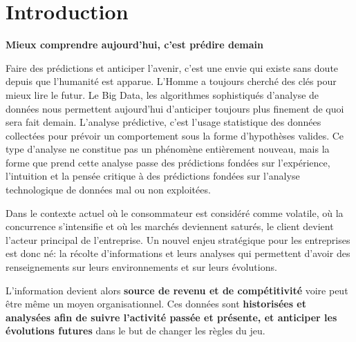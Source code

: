 \documentclass[12pt]{article}
\renewcommand{\listfigurename}{Liste des figues}
\begin{document}

\newpage
\strut


\newpage

\renewcommand{\contentsname}{Sommaire} %

\tableofcontents
\pagebreak

\newpage

\renewcommand{\listfigurename}{Liste des figures}

\listoffigures
\pagebreak
\newpage
\strut

\section{Introduction}
\textbf{\large Mieux comprendre aujourd’hui, c’est prédire demain}


Faire des prédictions et anticiper l’avenir, c’est une envie qui existe sans doute depuis que l’humanité est apparue. L’Homme a toujours cherché des clés pour mieux lire le futur.
Le Big Data, les algorithmes sophistiqués d’analyse de données nous permettent aujourd’hui d’anticiper toujours plus finement de quoi sera fait demain. 
L’analyse prédictive, c’est l’usage statistique des données collectées pour prévoir un comportement sous la forme d’hypothèses valides. Ce type d’analyse ne constitue pas un phénomène entièrement nouveau, mais la forme que prend cette analyse passe des prédictions fondées sur l’expérience, l’intuition et la pensée critique à des prédictions fondées sur l’analyse technologique de données mal ou non exploitées. 

Dans le contexte actuel où le consommateur est considéré comme volatile, où la concurrence s’intensifie et où les marchés deviennent saturés, le client devient l’acteur principal de l’entreprise. 
Un nouvel enjeu stratégique pour les entreprises est donc né: la récolte d’informations et leurs analyses qui permettent d’avoir des renseignements sur leurs environnements et sur leurs évolutions. 

L’information devient alors \textbf{source de revenu et de compétitivité} voire peut être même un moyen organisationnel. Ces données sont \textbf{historisées et analysées afin de suivre l’activité passée et présente, et anticiper les évolutions futures} dans le but de changer les règles du jeu.
\end{document}
